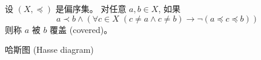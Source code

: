 
\begin{frame}{}
  \begin{definition}
    设 $(X, \preceq)$ 是偏序集。
    对任意 $a, b \in X$, 如果
    \[
      a \prec b \land
        (\forall c \in X\; (c \neq a \land c \neq b)
          \to \lnot (a \preceq c \preceq b))
    \]
    则称 $a$ 被 $b$ 覆盖 (covered)。
  \end{definition}

  \begin{center}
    哈斯图 (Hasse diagram)
  \end{center}
\end{frame}

\begin{frame}{}
  \begin{columns}
  \end{columns}
\end{frame}
